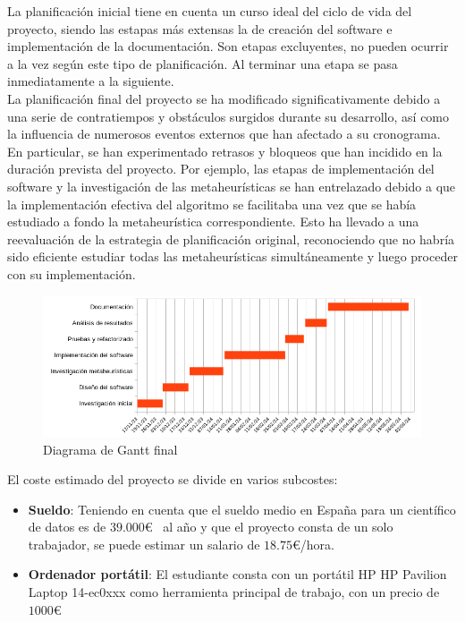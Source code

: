 La planificación inicial tiene en cuenta un curso ideal del ciclo de vida del proyecto, siendo las estapas más extensas la de creación del software e implementación de la documentación. Son etapas excluyentes, no pueden ocurrir a la vez según este tipo de planificación. Al terminar una etapa se pasa inmediatamente a la siguiente.\\[6pt]
La planificación final del proyecto se ha modificado significativamente debido a una serie de contratiempos y obstáculos surgidos durante su desarrollo, así como la influencia de numerosos eventos externos que han afectado a su cronograma. En particular, se han experimentado retrasos y bloqueos que han incidido en la duración prevista del proyecto. Por ejemplo, las etapas de implementación del software y la investigación de las metaheurísticas se han entrelazado debido a que la implementación efectiva del algoritmo se facilitaba una vez que se había estudiado a fondo la metaheurística correspondiente. Esto ha llevado a una reevaluación de la estrategia de planificación original, reconociendo que no habría sido eficiente estudiar todas las metaheurísticas simultáneamente y luego proceder con su implementación.

\begin{figure}[H]
      \begin{center}
      \includegraphics[width=1.2\textwidth]{imagenes/gantt-init.png}
      \end{center}
      \caption{Diagrama de Gantt final}
\end{figure}

El coste estimado del proyecto se divide en varios subcostes:
\begin{itemize}
      \item \textbf{Sueldo}: Teniendo en cuenta que el sueldo medio en España para un científico de datos es de $39.000$€~\cite{payscale_barcelona} al año y que el proyecto consta de un solo trabajador, se puede estimar un salario de $18.75$€/hora. 
      \item \textbf{Ordenador portátil}: El estudiante consta con un portátil HP HP Pavilion Laptop 14-ec0xxx como herramienta principal de trabajo, con un precio de $1000$€
\end{itemize}